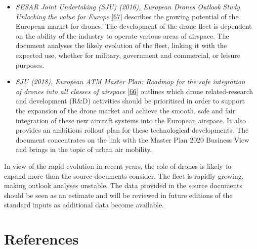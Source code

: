 \documentclass[
  11pt,
  a4paper,
]{book}
\begin{document}
\begin{itemize}
\item
  \emph{SESAR Joint Undertaking (SJU) (2016), European Drones Outlook
  Study. Unlocking the value for Europe}
  \protect\hyperlink{ref-sju:drones2016}{{[}67{]}} describes the growing
  potential of the European market for drones. The development of the
  drone fleet is dependent on the ability of the industry to operate
  various areas of airspace. The document analyses the likely evolution
  of the fleet, linking it with the expected use, whether for military,
  government and commercial, or leisure purposes.
\item
  \emph{SJU (2018), European ATM Master Plan: Roadmap for the safe
  integration of drones into all classes of airspace}
  \protect\hyperlink{ref-sju:drones:2018}{{[}66{]}} outlines which drone
  related-research and development (R\&D) activities should be
  prioritised in order to support the expansion of the drone market and
  achieve the smooth, safe and fair integration of these new aircraft
  systems into the European airspace. It also provides an ambitious
  rollout plan for these technological developments. The document
  concentrates on the link with the Master Plan 2020 Business View and
  brings in the topic of urban air mobility.
\end{itemize}

\begin{tcolorbox}[enhanced jigsaw, opacityback=0, arc=.35mm, colframe=quarto-callout-note-color-frame, breakable, left=2mm, leftrule=.75mm, titlerule=0mm, colbacktitle=quarto-callout-note-color!10!white, rightrule=.15mm, opacitybacktitle=0.6, bottomtitle=1mm, colback=white, toptitle=1mm, title=\textcolor{quarto-callout-note-color}{\faInfo}\hspace{0.5em}{Note}, bottomrule=.15mm, toprule=.15mm, coltitle=black]

In view of the rapid evolution in recent years, the role of drones is
likely to expand more than the source documents consider. The fleet is
rapidly growing, making outlook analyses unstable. The data provided in
the source documents should be seen as an estimate and will be reviewed
in future editions of the standard inputs as additional data become
available.

\end{tcolorbox}

\hypertarget{references-34}{%
\section{References}\label{references-34}}
\end{document}

